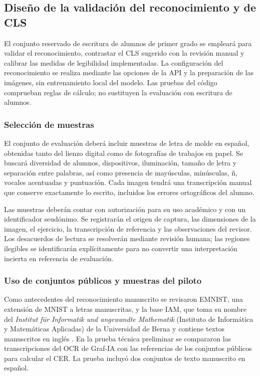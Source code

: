 \subsection{Diseño de la validación del reconocimiento y de CLS}
\label{sec:validacion-vision}

El conjunto reservado de escritura de alumnos de primer grado se empleará para validar el reconocimiento, contrastar el CLS sugerido con la revisión manual y calibrar las medidas de legibilidad implementadas. La configuración del reconocimiento se realiza mediante las opciones de la API y la preparación de las imágenes, sin entrenamiento local del modelo. Las pruebas del código comprueban reglas de cálculo; no sustituyen la evaluación con escritura de alumnos.

\subsubsection{Selección de muestras}
El conjunto de evaluación deberá incluir muestras de letra de molde en español, obtenidas tanto del lienzo digital como de fotografías de trabajos en papel. Se buscará diversidad de alumnos, dispositivos, iluminación, tamaño de letra y separación entre palabras, así como presencia de mayúsculas, minúsculas, ñ, vocales acentuadas y puntuación. Cada imagen tendrá una transcripción manual que conserve exactamente lo escrito, incluidos los errores ortográficos del alumno.

Las muestras deberán contar con autorización para su uso académico y con un identificador seudónimo. Se registrarán el origen de captura, las dimensiones de la imagen, el ejercicio, la transcripción de referencia y las observaciones del revisor. Los desacuerdos de lectura se resolverán mediante revisión humana; las regiones ilegibles se identificarán explícitamente para no convertir una interpretación incierta en referencia de evaluación.

\subsubsection{Uso de conjuntos públicos y muestras del piloto}
Como antecedentes del reconocimiento manuscrito se revisaron EMNIST, una extensión de MNIST a letras manuscritas, y la base IAM, que toma su nombre del \textit{Institut für Informatik und angewandte Mathematik} (Instituto de Informática y Matemáticas Aplicadas) de la Universidad de Berna y contiene textos manuscritos en inglés \cite{cohen2017emnist,marti2002iam}. En la prueba técnica preliminar se compararon las transcripciones del OCR de Graf-IA con las referencias de los conjuntos públicos para calcular el CER. La prueba incluyó dos conjuntos de texto manuscrito en español.

